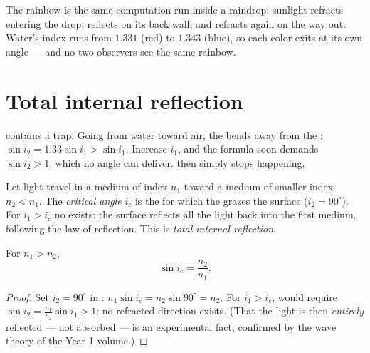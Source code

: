 \begin{remark}\label{rem:g10:refraction:rainbow}
The rainbow is the same computation run inside a raindrop: sunlight
refracts entering the drop, reflects on its back wall, and refracts
again on the way out. Water's index runs from $1.331$ (red) to $1.343$
(blue), so each color exits at its own angle --- and no two observers
see the same rainbow.
\end{remark}

\section{Total internal reflection}

 contains a trap. Going from water toward air, the  bends away from the : $\sin i_2 = 1.33 \sin i_1 > \sin i_1$.
Increase $i_1$, and the formula soon demands $\sin i_2 > 1$, which no
angle can deliver.  then simply stops happening.

\begin{definition}\label{def:g10:refraction:critical}
Let light travel in a medium of index $n_1$ toward a medium of smaller
index $n_2 < n_1$. The \emph{critical angle}
$i_c$ is the  for which the  grazes the
surface ($i_2 = 90^\circ$). For $i_1 > i_c$ no  exists: the
surface reflects all the light back into the first medium, following the
law of reflection. This is \emph{total internal
reflection}.
\end{definition}

\begin{proposition}\label{prop:g10:refraction:criticalformula}
For $n_1 > n_2$,
\[
\sin i_c = \frac{n_2}{n_1} .
\]
\end{proposition}

\begin{proof}
Set $i_2 = 90^\circ$ in : $n_1 \sin i_c = n_2 \sin 90^\circ
= n_2$. For $i_1 > i_c$,  would require
$\sin i_2 = \frac{n_1}{n_2}\sin i_1 > 1$: no refracted direction exists.
(That the light is then \emph{entirely} reflected --- not absorbed --- is
an experimental fact, confirmed by the wave theory of the Year 1
volume.)
\end{proof}

